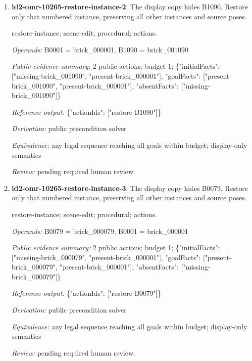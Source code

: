 \begin{enumerate}
\par{\small restore-instance; scene-edit; procedural; actions.\par\textit{Operands:} B0001 = brick\_000001, B0886 = brick\_000886\par\textit{Public evidence summary:} 2 public actions; budget 1; \{"initialFacts": ["missing-brick\_000886", "present-brick\_000001"], "goalFacts": ["present-brick\_000886", "present-brick\_000001"], "absentFacts": ["missing-brick\_000886"]\}\par\textit{Reference output:} \{"actionIds": ["restore-B0886"]\}\par\textit{Derivation:} public precondition solver\par\textit{Equivalence:} any legal sequence reaching all goals within budget; display-only semantics\par\textit{Review:} pending required human review.}
\item \textbf{ld2-omr-10265-restore-instance-2}. The display copy hides B1090. Restore only that numbered instance, preserving all other instances and source poses.
\par{\small restore-instance; scene-edit; procedural; actions.\par\textit{Operands:} B0001 = brick\_000001, B1090 = brick\_001090\par\textit{Public evidence summary:} 2 public actions; budget 1; \{"initialFacts": ["missing-brick\_001090", "present-brick\_000001"], "goalFacts": ["present-brick\_001090", "present-brick\_000001"], "absentFacts": ["missing-brick\_001090"]\}\par\textit{Reference output:} \{"actionIds": ["restore-B1090"]\}\par\textit{Derivation:} public precondition solver\par\textit{Equivalence:} any legal sequence reaching all goals within budget; display-only semantics\par\textit{Review:} pending required human review.}
\item \textbf{ld2-omr-10265-restore-instance-3}. The display copy hides B0079. Restore only that numbered instance, preserving all other instances and source poses.
\par{\small restore-instance; scene-edit; procedural; actions.\par\textit{Operands:} B0079 = brick\_000079, B0001 = brick\_000001\par\textit{Public evidence summary:} 2 public actions; budget 1; \{"initialFacts": ["missing-brick\_000079", "present-brick\_000001"], "goalFacts": ["present-brick\_000079", "present-brick\_000001"], "absentFacts": ["missing-brick\_000079"]\}\par\textit{Reference output:} \{"actionIds": ["restore-B0079"]\}\par\textit{Derivation:} public precondition solver\par\textit{Equivalence:} any legal sequence reaching all goals within budget; display-only semantics\par\textit{Review:} pending required human review.}
\end{enumerate}
